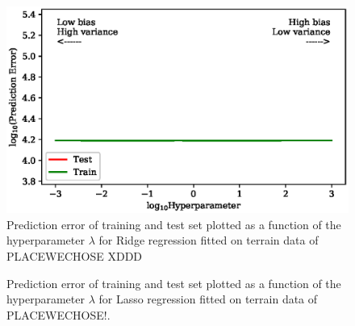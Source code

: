 \documentclass[a4paper, 10pt]{article}
\begin{document}
\begin{figure}[H]
    \includegraphics{figs/biasvariancetradeoff_Ridge_terrain.eps}
    \caption{Prediction error of training and test set plotted as a function of the hyperparameter $\lambda$ for Ridge regression fitted on terrain data of PLACEWECHOSE XDDD}
    \label{fig:bias_ridge_terrain}
\end{figure}    

\begin{figure}[H]
    \caption{Prediction error of training and test set plotted as a function of the hyperparameter $\lambda$ for Lasso regression fitted on terrain data of PLACEWECHOSE!.}
    \label{fig:bias_lasso_terrain}
\end{figure} 
\end{document}
